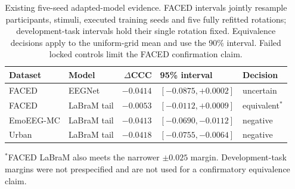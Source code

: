 \begin{table}[t]\centering\small
\caption{Existing five-seed adapted-model evidence. FACED intervals jointly resample participants, stimuli, executed training seeds and five fully refitted rotations; development-task intervals hold their single rotation fixed. Equivalence decisions apply to the uniform-grid mean and use the 90\% interval. Failed locked controls limit the FACED confirmation claim.}
\label{tab:v14-primary}
\setlength{\tabcolsep}{3pt}
\begin{tabularx}{\linewidth}{@{}l l r X l@{}}\toprule
Dataset & Model & $\Delta$CCC & 95\% interval & Decision\\\midrule
FACED & EEGNet & $-0.0414$ & $[-0.0875, +0.0002]$ & uncertain \\
FACED & LaBraM tail & $-0.0053$ & $[-0.0112, +0.0009]$ & equivalent$^{*}$ \\
EmoEEG-MC & LaBraM tail & $-0.0413$ & $[-0.0690, -0.0112]$ & negative \\
Urban & LaBraM tail & $-0.0418$ & $[-0.0755, -0.0064]$ & negative \\
\bottomrule\end{tabularx}
\vspace{2pt}\parbox{\linewidth}{\footnotesize $^{*}$FACED LaBraM also meets the narrower $\pm0.025$ margin. Development-task margins were not prespecified and are not used for a confirmatory equivalence claim.}
\end{table}
